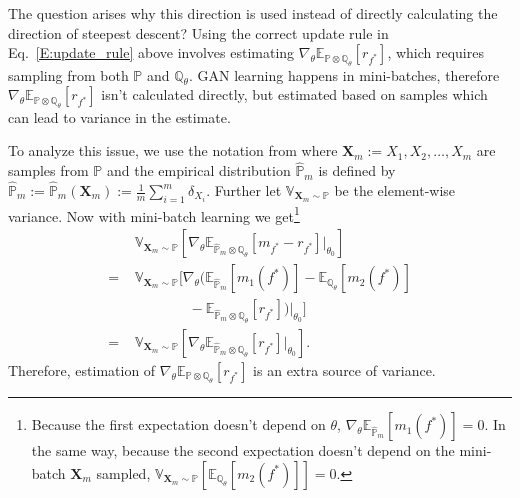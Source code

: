 \documentclass{article}
\begin{document}
 The question arises why this direction is used instead of directly calculating the direction of steepest descent?
 Using the correct update rule in Eq.\ \ref{E:update_rule} above involves estimating 
 $\nabla_\theta\mathbb E_{\mathbb P\otimes\mathbb Q_\theta}[r_{f^*}]$, which requires sampling from both $\mathbb P$ and $\mathbb Q_\theta$.
 GAN learning happens in mini-batches, therefore $\nabla_\theta\mathbb E_{\mathbb P\otimes\mathbb Q_\theta}[r_{f^*}]$ isn't calculated directly, but estimated
 based on samples which can lead to variance in the estimate.

 To analyze this issue, we use the notation from \cite{bellemare2017cramer} where $\mathbf{X}_m := X_1, X_2,\ldots, X_m$ are samples from $\mathbb P$ and
 the empirical distribution $\hat{\mathbb P}_m$ is defined by
$\hat{\mathbb P}_m := \hat{\mathbb P}_m(\mathbf{X}_m) := \frac 1 m \sum_{i=1}^m\delta_{X_i}$.
Further let $\mathbb V_{\mathbf{X}_m\sim\mathbb P}$ be the element-wise variance.
Now with mini-batch learning we get\footnote{Because the first expectation doesn't depend on $\theta$, $\nabla_\theta\mathbb E_{\hat{\mathbb P}_m}[m_1(f^*)]=0$. In the same way,
 because the second expectation doesn't depend on the mini-batch $\mathbf X_m$ sampled,  $\mathbb V_{\mathbf{X}_m\sim\mathbb P}[\mathbb E_{\mathbb Q_\theta}[m_2(f^*)]]=0$.}
\begin{align*}
 &\,\mathbb V_{\mathbf{X}_m\sim\mathbb P}[\nabla_\theta\mathbb E_{\hat{\mathbb P}_m\otimes\mathbb Q_\theta}[m_{f^*}-r_{f^*}]|_{\theta_0}] \\
 =\,&\,\mathbb V_{\mathbf{X}_m\sim\mathbb P}[\nabla_\theta(\mathbb E_{\hat{\mathbb P}_m}[m_1(f^*)]-\mathbb E_{\mathbb Q_\theta}[m_2(f^*)] \\
 &\quad\quad\quad\;\;\;\,-\mathbb E_{\hat{\mathbb P}_m\otimes\mathbb Q_\theta}[r_{f^*}])|_{\theta_0}]\\
 =\,&\,\mathbb V_{\mathbf{X}_m\sim\mathbb P}[\nabla_\theta\mathbb E_{\hat{\mathbb P}_m\otimes\mathbb Q_\theta}[r_{f^*}]|_{\theta_0}].
\end{align*}
Therefore, estimation of $\nabla_\theta\mathbb E_{\mathbb P\otimes\mathbb Q_\theta}[r_{f^*}]$ is an extra source of variance.
\end{document}
